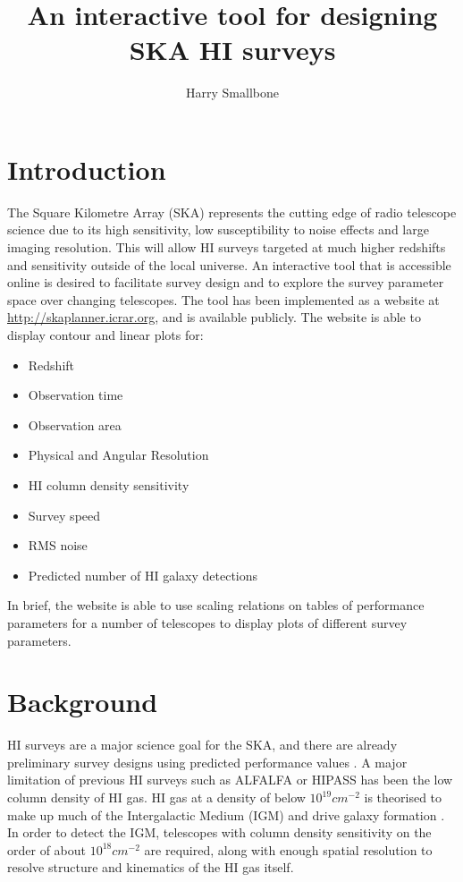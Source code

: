 \documentclass[11pt]{article}
\title{An interactive tool for designing SKA HI surveys}
\author{Harry Smallbone}
\begin{document}
\maketitle

\section{Introduction}

The Square Kilometre Array (SKA) represents the cutting edge of radio telescope science due to its high sensitivity, low susceptibility to noise effects and large imaging resolution. This will allow HI surveys targeted at much higher redshifts and sensitivity outside of the local universe. An interactive tool that is accessible online is desired to facilitate survey design and to explore the survey parameter space over changing telescopes. The tool has been implemented as a website at \url{http://skaplanner.icrar.org}, and is available publicly. The website is able to display contour and linear plots for: 
\begin{itemize}
\item Redshift
\item Observation time
\item Observation area
\item Physical and Angular Resolution
\item HI column density sensitivity
\item Survey speed
\item RMS noise
\item Predicted number of HI galaxy detections
\end{itemize}
In brief, the website is able to use scaling relations on tables of performance parameters for a number of telescopes to display plots of different survey parameters. 

\section{Background}
HI surveys are a major science goal for the SKA, and there are already preliminary survey designs using predicted performance values \parencite{lister2015}. A major limitation of previous HI surveys such as ALFALFA \parencite{alfalfa} or HIPASS \parencite{hipass2003} has been the low column density of HI gas. HI gas at a density of below $10^{19} cm^{-2}$ is theorised to make up much of the Intergalactic Medium (IGM) and drive galaxy formation \parencite{popping2014}. In order to detect the IGM, telescopes with column density sensitivity on the order of about $ 10^{18} cm^{-2} $ are required, along with enough spatial resolution to resolve structure and kinematics of the HI gas itself.
\end{document}
